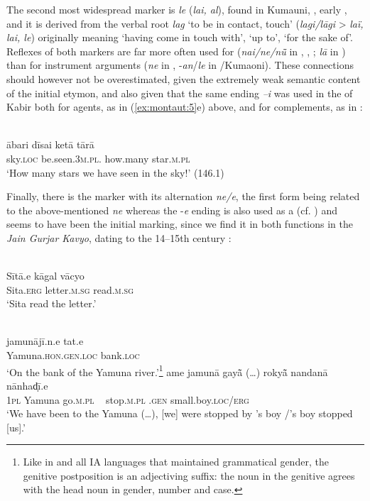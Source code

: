\documentclass[output=paper]{langsci/langscibook}
\begin{document}
The second most widespread  marker is \textit{le} (\textit{lai, al}), found in Kumauni, , early , and it is derived from the verbal root \textit{lag} ‘to be in contact, touch’ (\textit{lagi/lāgi} > \textit{laï, lai, le}) originally meaning ‘having come in touch with’, ‘up to’, ‘for the sake of’. Reflexes of both markers are far more often used for  (\textit{nai/ne/n\~{ū}} in , , ; \textit{lā} in ) than for instrument arguments (\textit{ne} in , -\textit{an}/\textit{le} in /Kumaoni). These connections should however not be overestimated, given the extremely weak semantic content of the initial etymon, and also given that the same ending \textit{–i} was used in the  of Kabir both for agents, as in (\ref{ex:montaut:5}e) above, and for  complements, as in :

\ea
\label{ex:montaut:12}
\\
\gll ābari dīsai                ketā   tārā\\
sky.\textsc{loc}   be.seen.\textsc{3m.pl}.     how.many  star.\textsc{m.pl}  \\
\glt ‘How many stars we have seen in the sky!’ (146.1)
\z 

Finally, there is the   marker with its alternation \textit{ne/e}, the first form being related to the above-mentioned \textit{ne} whereas the -\textit{e} ending is also used as a   (cf. \citealt[678]{Cardona2003}) and seems to have been the initial marking, since we find it in both functions in the \textit{Jain Gurjar Kavyo}, dating to the 14--15th century :

\ea
\label{ex:montaut:13}
\\
\gll Sītā.e      kāgal         vācyo\\
    Sita.\textsc{erg}    letter.\textsc{m.sg}   read.\textsc{m.sg} \\
\glt ‘Sita read the letter.’  \citep[426]{Mistry1997}
\z    
    
\ea
\label{ex:montaut:14}
\ea 
{}\\
\gll jamunājī.n.e                tat.e\\
Yamuna.\textsc{hon.gen.loc} bank.\textsc{loc}\\
\glt ‘On the bank of the Yamuna river.’\footnote{Like in  and all IA languages that maintained grammatical gender, the genitive postposition is an adjectiving suffix: the noun in the genitive agrees with the head noun in gender, number and case.} \citep[630]{Desai1926}
\ex 
\gll ame   jamunā  gay\~{ā} (…) roky\~{ā}       nandanā     nānhad̩ī.e\\
 \textsc{1pl}   Yamuna  go.\textsc{m.pl}  ~   stop.\textsc{m.pl}  .\textsc{gen}    small.boy.\textsc{loc/erg}\\
\glt ‘We have been to the Yamuna (…), [we] were stopped by ’s boy /’s boy stopped [us].’ \citep[630]{Desai1926}
\z 
\z 
\end{document}
